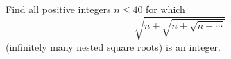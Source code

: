 Find all positive integers $n\le40$ for which
\[
\sqrt{n+\sqrt{n+\sqrt{n+\cdots}}}
\]
(infinitely many nested square roots) is an integer.
